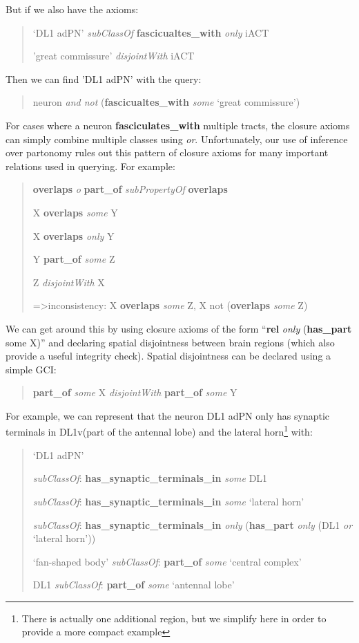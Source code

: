 \documentclass[runningheads,a4paper]{llncs}
\begin{document}
But if we also have the axioms:

\begin{quote}
`DL1 adPN' \textit{subClassOf} \textbf{fascicualtes\_with} \textit{only} iACT

'great commissure' \textit{disjointWith} iACT
\end{quote}

Then we can find 'DL1 adPN' with the query:
\begin{quote} 
	neuron \textit{and not} (\textbf{fascicualtes\_with} \textit{some} `great commissure')
\end{quote}

For cases where a neuron \textbf{fasciculates\_with} multiple tracts, the
closure axioms can simply combine multiple classes using
\textit{or}. Unfortunately, our use of inference over partonomy rules out
this pattern of closure axioms for many important relations used in querying.  For example:

\begin{quote}
\textbf{overlaps} \textit{o} \textbf{part\_of} \textit{subPropertyOf}
\textbf{overlaps}

X \textbf{overlaps} \textit{some} Y

X \textbf{overlaps} \textit{only} Y 

Y \textbf{part\_of} \textit{some} Z

Z \textit{disjointWith} X

=\textgreater inconsistency: X \textbf{overlaps} \textit{some} Z, X not (\textbf{overlaps} \textit{some} Z)
\end{quote}


We can get around this by using closure axioms of the form
``\textbf{rel} \textit{only} (\textbf{has\_part} some X)'' and declaring spatial
disjointness between brain regions (which also provide a useful
integrity check). Spatial disjointness can be declared using a simple
GCI:

\begin{quote} 
\textbf{part\_of} \textit{some} X \textit{disjointWith} \textbf{part\_of} \textit{some} Y
\end{quote}

For example, we can represent that the neuron DL1 adPN only has
synaptic terminals in DL1v(part of the antennal lobe) and the lateral
horn\footnote{There is  actually one additional region, but we
  simplify here in order to  provide a more compact example} with:

\begin{quote} 
`DL1 adPN'

\textit{subClassOf}: \textbf{has\_synaptic\_terminals\_in}
\textit{some} DL1

\textit{subClassOf}: \textbf{has\_synaptic\_terminals\_in}
\textit{some} `lateral horn'

\textit{subClassOf}: \textbf{has\_synaptic\_terminals\_in}
\textit{only} (\textbf{has\_part} \textit{only} (DL1 \textit{or}
`lateral horn'))

`fan-shaped body' \textit{subClassOf}: \textbf{part\_of} \textit{some}
`central complex'

DL1 \textit{subClassOf}: \textbf{part\_of} \textit{some} `antennal lobe'
\end{quote}
\end{document}
